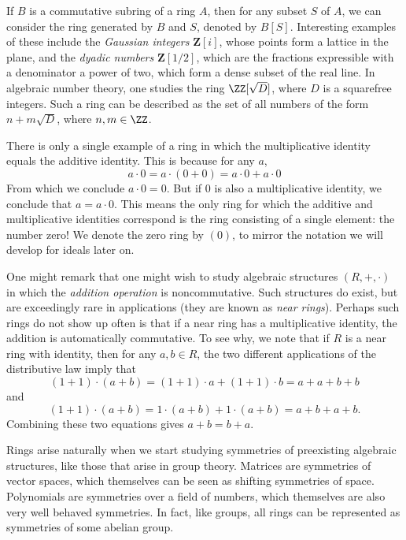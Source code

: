 \begin{example}
    If $B$ is a commutative subring of a ring $A$, then for any subset $S$ of $A$, we can consider the ring generated by $B$ and $S$, denoted by $B[S]$. Interesting examples of these include the \emph{Gaussian integers} $\mathbf{Z}[i]$, whose points form a lattice in the plane, and the \emph{dyadic numbers} $\mathbf{Z}[1/2]$, which are the fractions expressible with a denominator a power of two, which form a dense subset of the real line. In algebraic number theory, one studies the ring $\ZZ[\sqrt{D}]$, where $D$ is a squarefree integers. Such a ring can be described as the set of all numbers of the form $n + m \sqrt{D}$, where $n,m \in \ZZ$.
\end{example}

\begin{remark}
    There is only a single example of a ring in which the multiplicative identity equals the additive identity. This is because for any $a$,
    \[ a \cdot 0 = a \cdot (0 + 0) = a \cdot 0 + a \cdot 0 \]
    From which we conclude $a \cdot 0 = 0$. But if $0$ is also a multiplicative identity, we conclude that $a = a \cdot 0$. This means the only ring for which the additive and multiplicative identities correspond is the ring consisting of a single element: the number zero! We denote the zero ring by $(0)$, to mirror the notation we will develop for ideals later on.
\end{remark}

\begin{remark}
    One might remark that one might wish to study algebraic structures $(R,+,\cdot)$ in which the \emph{addition operation} is noncommutative. Such structures do exist, but are exceedingly rare in applications (they are known as \emph{near rings}). Perhaps such rings do not show up often is that if a near ring has a multiplicative identity, the addition is automatically commutative. To see why, we note that if $R$ is a near ring with identity, then for any $a,b \in R$, the two different applications of the distributive law imply that
    \[ (1 + 1) \cdot (a + b) = (1 + 1) \cdot a + (1 + 1) \cdot b = a + a + b + b \]
    and
    \[ (1 + 1) \cdot (a + b) = 1 \cdot (a + b) + 1 \cdot (a + b) = a + b + a + b. \]
    Combining these two equations gives $a + b = b + a$.
\end{remark}

Rings arise naturally when we start studying symmetries of preexisting algebraic structures, like those that arise in group theory. Matrices are symmetries of vector spaces, which themselves can be seen as shifting symmetries of space. Polynomials are symmetries over a field of numbers, which themselves are also very well behaved symmetries. In fact, like groups, all rings can be represented as symmetries of some abelian group.

